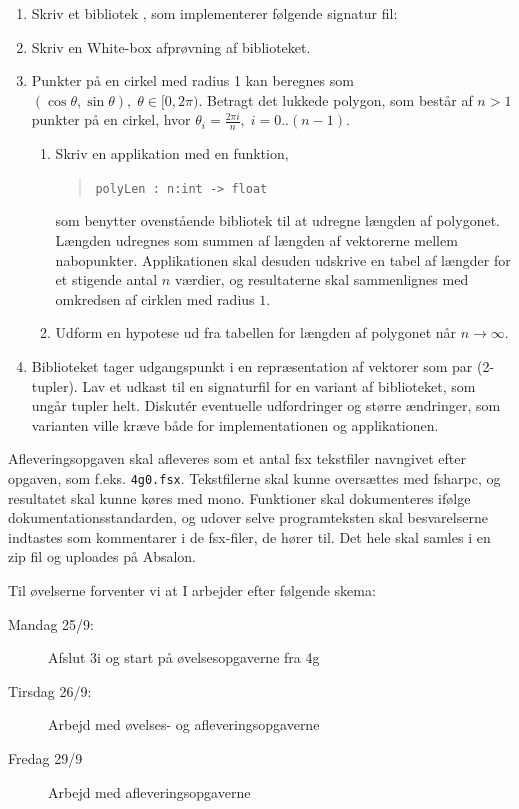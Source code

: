 \documentclass[a4paper,12pt]{article}
\begin{document}
\begin{enumerate}[label=4g.\arabic*,start=0]
\item Skriv et bibliotek , som implementerer følgende signatur fil:
\item Skriv en White-box afprøvning af biblioteket.
\item Punkter på en cirkel med radius 1 kan beregnes som $(\cos \theta, \sin \theta), \;\theta\in [0,2\pi)$. Betragt det lukkede polygon, som består af $n>1$ punkter på en cirkel, hvor $\theta_i = \frac{2\pi i}{n},\; i = 0..(n-1)$. 
  \begin{enumerate}
  \item Skriv en applikation med en funktion,
  \begin{quote}
    \lstinline{polyLen : n:int -> float}
  \end{quote}
som benytter ovenstående bibliotek til at udregne længden af polygonet. Længden udregnes som summen af længden af vektorerne mellem nabopunkter. Applikationen skal desuden udskrive en tabel af længder for et stigende antal $n$ værdier, og resultaterne skal sammenlignes med omkredsen af cirklen med radius $1$. 
\item Udform en hypotese ud fra tabellen for længden af polygonet når $n\rightarrow\infty$.
  \end{enumerate}
\item Biblioteket  tager udgangspunkt i en repræsentation af vektorer som par (2-tupler). Lav et udkast til en signaturfil for en variant af biblioteket, som ungår tupler helt. Diskut\'{e}r eventuelle udfordringer og større ændringer, som varianten ville kræve både for implementationen og applikationen.
\end{enumerate}
Afleveringsopgaven skal afleveres som et antal fsx tekstfiler navngivet efter opgaven, som f.eks. \lstinline!4g0.fsx!. Tekstfilerne skal kunne oversættes med fsharpc, og resultatet skal kunne køres med mono. Funktioner skal dokumenteres ifølge dokumentationsstandarden, og udover selve programteksten skal besvarelserne indtastes som kommentarer i de fsx-filer, de hører til. Det hele skal samles i en zip fil og uploades på Absalon.

Til øvelserne forventer vi at I arbejder efter følgende skema:
\begin{description}
\item[Mandag 25/9:] Afslut 3i og start på øvelsesopgaverne fra 4g
\item[Tirsdag 26/9:] Arbejd med øvelses- og afleveringsopgaverne
\item[Fredag 29/9]  Arbejd med afleveringsopgaverne
\end{description}
\end{document}
